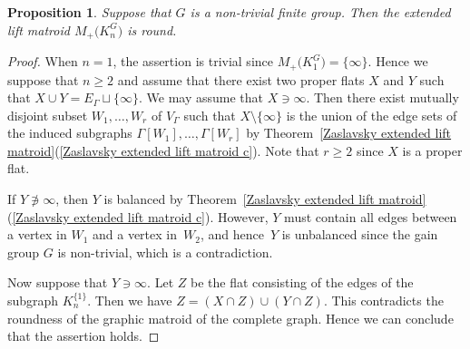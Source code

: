 \documentclass[pdftex]{sigma}
\numberwithin{equation}{section}
\newtheorem{Proposition}[Theorem]{Proposition}
 { \theoremstyle{definition}
\newtheorem{Definition}[Theorem]{Definition}
\newtheorem{Example}[Theorem]{Example}
\newtheorem{Remark}[Theorem]{Remark}
\newtheorem{Question}[Theorem]{Question} }
\begin{document}
\begin{Proposition}\label{extended lift round}
Suppose that $ G $ is a non-trivial finite group.
Then the extended lift matroid $ M_{+}\big(K_{n}^{G}\big) $ is round.
\end{Proposition}
\begin{proof}
When $ n=1 $, the assertion is trivial since $ M_{+}\big(K_{1}^{G}\big) = \{\infty\} $.
Hence we suppose that $ n \geq 2 $ and assume that there exist two proper flats $ X $ and $ Y $ such that $ X \cup Y = E_{\Gamma} \sqcup \{\infty\} $.
We may assume that $ X \ni \infty $.
Then there exist mutually disjoint subset $ W_{1}, \dots, W_{r} $ of $ V_{\Gamma} $ such that $ X \setminus \{\infty\} $ is the union of the edge sets of the induced subgraphs $ \Gamma[W_{1}], \dots, \Gamma[W_{r}] $ by Theorem~\ref{Zaslavsky extended lift matroid}(\ref{Zaslavsky extended lift matroid c}).
Note that $ r \geq 2 $ since $ X $ is a proper flat.

If $ Y \not\ni \infty $, then $ Y $ is balanced by Theorem~\ref{Zaslavsky extended lift matroid}(\ref{Zaslavsky extended lift matroid c}).
However, $ Y $ must contain all edges between a vertex in $ W_{1} $ and a vertex in~$ W_{2} $, and hence~$ Y $ is unbalanced since the gain group $ G $ is non-trivial, which is a contradiction.

Now suppose that $ Y \ni \infty $.
Let $ Z $ be the flat consisting of the edges of the subgraph $ K_{n}^{\{1\}} $.
Then we have $ Z = (X\cap Z) \cup (Y\cap Z) $.
This contradicts the roundness of the graphic matroid of the complete graph.
Hence we can conclude that the assertion holds.
\end{proof}
\end{document}
